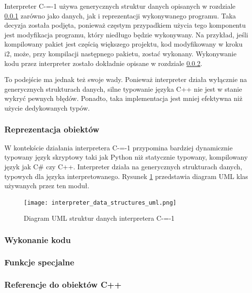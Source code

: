 Interpreter C-=-1 używa generycznych struktur danych opisanych w rozdziale \ref{implementation:interpreter:object_representation} zarówno jako danych, jak i reprezentacji wykonywanego programu.
Taka decyzja została podjęta, ponieważ częstym przypadkiem użycia tego komponentu jest modyfikacja programu, który niedługo będzie wykonywany.
Na przykład, jeśli kompilowany pakiet jest częścią większego projektu, kod modyfikowany w kroku i2, może, przy kompilacji następnego pakietu, zostać wykonany.
Wykonywanie kodu przez interpreter zostało dokładnie opisane w rozdziale \ref{implementation:interpreter:code_execution}.

To podejście ma jednak też swoje wady.
Ponieważ interpreter działa wyłącznie na generycznych strukturach danych, silne typowanie języka C++ nie jest w stanie wykryć pewnych błędów.
Ponadto, taka implementacja jest mniej efektywna niż użycie dedykowanych typów.

\subsubsection{Reprezentacja obiektów}
\label{implementation:interpreter:object_representation}

W kontekście działania interpretera C-=-1 przypomina bardziej dynamicznie typowany język skryptowy taki jak Python \cite{van1995python} niż statycznie typowany, kompilowany język jak C\# czy C++.
Interpreter działa na generycznych strukturach danych, typowych dla języka interpretowanego.
Rysunek \ref{implementation:data_structures:uml_diagram} przedstawia diagram UML klas używanych przez ten moduł.


\begin{figure}
    \caption{Diagram UML struktur danych interpretera C-=-1}
    \label{implementation:data_structures:uml_diagram}
    \texttt{[image: interpreter\_data\_structures\_uml.png]}
\end{figure}

\subsubsection{Wykonanie kodu}
\label{implementation:interpreter:code_execution}

\subsubsection{Funkcje specjalne}
\label{implementation:interpreter:special_functions}

\subsubsection{Referencje do obiektów C++}
\label{implementation:interpreter:cpp_object_references}

